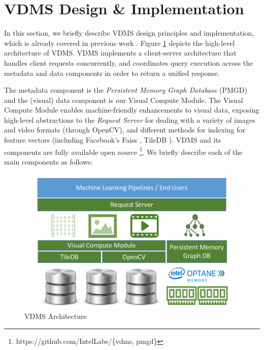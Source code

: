 \section{VDMS Design \& Implementation}
\label{arch}

In this section, we briefly describe VDMS design principles and implementation, which is already covered in previous work \cite{vdms-nips}.
Figure \ref{fig:arch} depicts the high-level architecture of VDMS.
VDMS implements a client-server architecture that handles client
requests concurrently, and coordinates query execution across
the metadata and data components in order to return a unified response.

The metadata component is the \textit{Persistent Memory Graph
Database} (PMGD) and the (visual) data component is our Visual Compute Module.
The Visual Compute Module enables machine-friendly enhancements to
visual data, exposing high-level abstractions to the \textit{Request Server}
for dealing with a variety of images and video formats (through OpenCV),
and different methods for indexing for feature vectors
(including Facebook's Faiss \cite{faiss}, TileDB \cite{TileDB}).
VDMS and its components are fully available open source
\footnote{https://github.com/IntelLabs/\{vdms, pmgd\}}.
We briefly describe each of the main components as follows:

\begin{figure}
\centering
\includegraphics[width=1\columnwidth]{figures/vdms_arch.pdf}
\caption{VDMS Architecture}
\label{fig:arch}
\end{figure}

